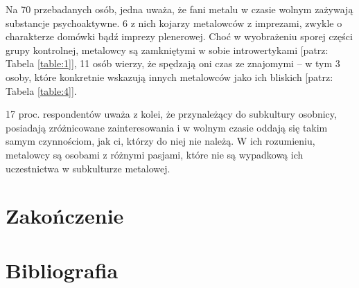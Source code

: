 \documentclass[12pt, a4paper, titlepage]{report}
\begin{document}
Na 70 przebadanych osób, jedna uważa, że fani metalu w czasie wolnym zażywają substancje psychoaktywne. 6 z nich kojarzy metalowców z imprezami, zwykle o charakterze domówki bądź imprezy plenerowej. Choć w wyobrażeniu sporej części grupy kontrolnej, metalowcy są zamkniętymi w sobie introwertykami [patrz: Tabela \ref{table:1}], 11 osób wierzy, że spędzają oni czas ze znajomymi -- w tym 3 osoby, które konkretnie wskazują innych metalowców jako ich bliskich [patrz: Tabela \ref{table:4}].

17 proc. respondentów uważa z kolei, że przynależący do subkultury osobnicy, posiadają zróżnicowane zainteresowania i w wolnym czasie oddają się takim samym czynnościom, jak ci, którzy do niej nie należą. W ich rozumieniu, metalowcy są osobami z różnymi pasjami, które nie są wypadkową ich uczestnictwa w subkulturze metalowej.

\chapter*{Zakończenie}
\chapter*{Bibliografia}
\end{document}

